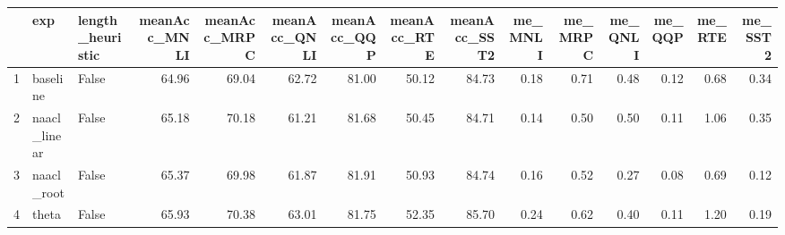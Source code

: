 \begin{table}[ht]
\centering
\begin{tabular}{rllrrrrrrrrrrrr}
  \hline
 & exp & length\_heuristic & meanAcc\_MNLI & meanAcc\_MRPC & meanAcc\_QNLI & meanAcc\_QQP & meanAcc\_RTE & meanAcc\_SST2 & me\_MNLI & me\_MRPC & me\_QNLI & me\_QQP & me\_RTE & me\_SST2 \\ 
  \hline
1 & baseline & False & 64.96 & 69.04 & 62.72 & 81.00 & 50.12 & 84.73 & 0.18 & 0.71 & 0.48 & 0.12 & 0.68 & 0.34 \\ 
  2 & naacl\_linear & False & 65.18 & 70.18 & 61.21 & 81.68 & 50.45 & 84.71 & 0.14 & 0.50 & 0.50 & 0.11 & 1.06 & 0.35 \\ 
  3 & naacl\_root & False & 65.37 & 69.98 & 61.87 & 81.91 & 50.93 & 84.74 & 0.16 & 0.52 & 0.27 & 0.08 & 0.69 & 0.12 \\ 
  4 & theta & False & 65.93 & 70.38 & 63.01 & 81.75 & 52.35 & 85.70 & 0.24 & 0.62 & 0.40 & 0.11 & 1.20 & 0.19 \\ 
   \hline
\end{tabular}
\end{table}
